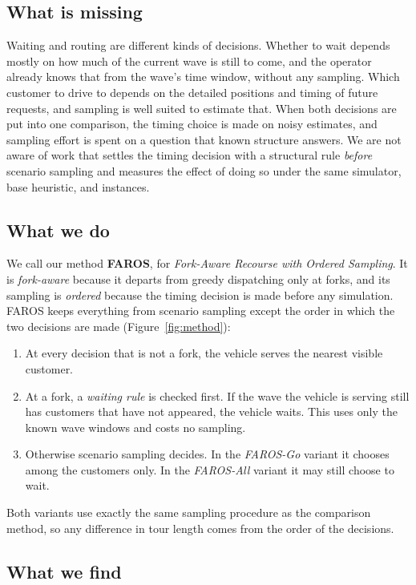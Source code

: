 \documentclass[5p,times,authoryear]{elsarticle}
\begin{document}
\subsection{What is missing}

Waiting and routing are different kinds of decisions. Whether to wait depends mostly on how much of the current wave is still to come, and the operator already knows that from the wave's time window, without any sampling. Which customer to drive to depends on the detailed positions and timing of future requests, and sampling is well suited to estimate that. When both decisions are put into one comparison, the timing choice is made on noisy estimates, and sampling effort is spent on a question that known structure answers. We are not aware of work that settles the timing decision with a structural rule \emph{before} scenario sampling and measures the effect of doing so under the same simulator, base heuristic, and instances.

\subsection{What we do}

We call our method \textbf{FAROS}, for \emph{Fork-Aware Recourse with Ordered Sampling}. It is \emph{fork-aware} because it departs from greedy dispatching only at forks, and its sampling is \emph{ordered} because the timing decision is made before any simulation. FAROS keeps everything from scenario sampling except the order in which the two decisions are made (Figure~\ref{fig:method}):
\begin{enumerate}[label=\arabic*.,leftmargin=*,nosep,topsep=2pt]
\item At every decision that is not a fork, the vehicle serves the nearest visible customer.
\item At a fork, a \emph{waiting rule} is checked first. If the wave the vehicle is serving still has customers that have not appeared, the vehicle waits. This uses only the known wave windows and costs no sampling.
\item Otherwise scenario sampling decides. In the \emph{FAROS-Go} variant it chooses among the customers only. In the \emph{FAROS-All} variant it may still choose to wait.
\end{enumerate}
Both variants use exactly the same sampling procedure as the comparison method, so any difference in tour length comes from the order of the decisions.

\subsection{What we find}
\end{document}
